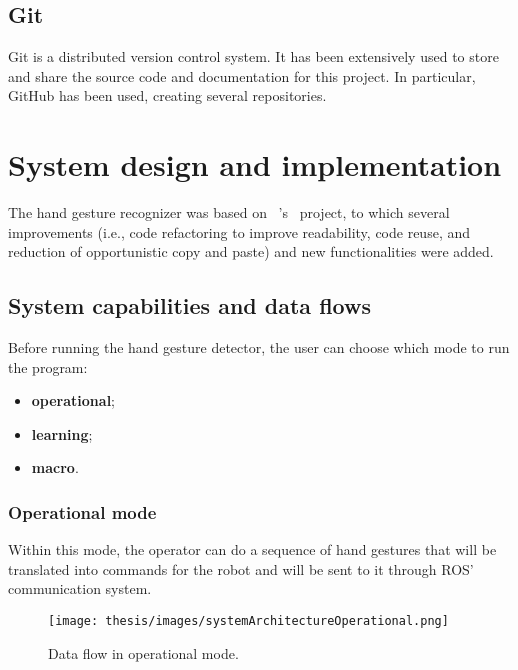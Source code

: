 \documentclass[../thesis.tex]{subfiles}
\begin{document}
\subsection{Git}
Git is a distributed version control system. It has been extensively used to store and share the source code and documentation for this project. In particular, GitHub has been used, creating several repositories.

\section{System design and implementation}\label{sec:system_design_and_implementation}
The hand gesture recognizer was based on ~\citeauthor{site:hand_gesture_base_repo}'s~\cite{site:hand_gesture_base_repo} project, to which several improvements (i.e., code refactoring to improve readability, code reuse, and reduction of opportunistic copy and paste) and new functionalities were added.

\subsection{System capabilities and data flows}
Before running the hand gesture detector, the user can choose which mode to run the program:
\begin{itemize}
    \item \textbf{operational};
    \item \textbf{learning};
    \item \textbf{macro}.
\end{itemize}

\subsubsection{Operational mode}\label{sss:operational_mode}
Within this mode, the operator can do a sequence of hand gestures that will be translated into commands for the robot and will be sent to it through \acrshort{ROS}' communication system.
\begin{figure}[H]
    \centering
    \texttt{[image: thesis/images/systemArchitectureOperational.png]}
    \caption{Data flow in operational mode.}
    \label{fig:system_architecture_operational}
\end{figure}
\end{document}
